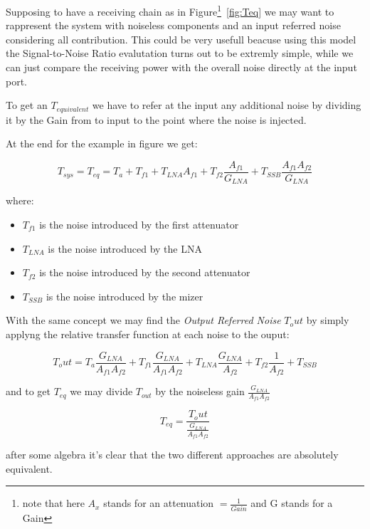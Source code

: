 Supposing to have a receiving chain as in Figure\footnote{note that here $A_x$ stands for an attenuation $= \frac{1}{Gain}$ and G stands for a Gain}~\ref{fig:Teq} we may want to rappresent the system with noiseless components and an input referred noise considering all contribution.
This could be very usefull beacuse using this model the Signal-to-Noise Ratio evalutation turns out to be extremly simple, while we can just compare the receiving power with the overall noise directly at the input port.

To get an $T_{equivalent}$ we have to refer at the input any additional noise by dividing it by the Gain from to input to the point where the noise is injected.

At the end for the example in figure we get:

\begin{equation}
	T_{sys}=T_{eq}= T_a + T_{f1} + T_{LNA} A_{f1}+ T_{f2} \frac { A_{f1} } {G_{LNA}} + T_{SSB} \frac { A_{f1} A_{f2} } {G_{LNA}}
\end{equation}

where:
\begin{itemize}
	\item $T_{f1}$ is the noise introduced by the first attenuator
	\item $T_{LNA}$ is the noise introduced by the LNA
	\item $T_{f2}$ is the noise introduced by the second attenuator
	\item $T_{SSB}$ is the noise introduced by the mizer
\end{itemize}
With the same concept we may find the \textit{Output Referred Noise} $T_out$ by simply applyng the relative transfer function at each noise to the ouput:

\begin{equation}
	T_out = T_a\frac {G_{LNA}} {A_{f1} A_{f2} } + T_{f1}\frac { G_{LNA}} {A_{f1}A_{f2}} + T_{LNA}\frac{G_{LNA}}{A_{f2}}+ T_{f2}\frac{1}{A_{f2}} + T_{SSB} 
\end{equation}

and to get $T_{eq}$ we may divide $T_{out}$ by the noiseless gain $\frac{G_{LNA}}{A_{f1}A_{f2}}$

\begin{equation}
	T_{eq}=\frac{T_out}{\frac{G_{LNA}}{A_{f1}A_{f2}}}
\end{equation}

after some algebra it's clear that the two different approaches are absolutely equivalent.








